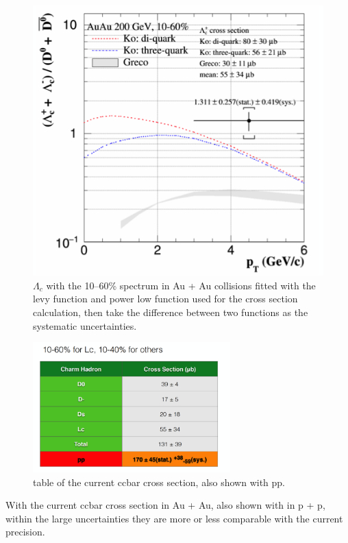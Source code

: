 \begin{figure}[htbp]
\begin{minipage}[htbp]{0.47\linewidth}
\includegraphics[width=1.0\textwidth,angle=0]{figure/Run14_D0HFT/ccx_4.png}
\caption{$\Lambda_{c}$ with the 10--60\% spectrum in Au + Au collisions fitted with the levy function and power low function used for the cross section calculation, then take the difference between two functions as the systematic uncertainties. \label{ccx_4}}
\end{minipage}
\end{figure}

\begin{figure}
\centering
\includegraphics[width=0.68\textwidth]{figure/Run14_D0HFT/ccx_5.png}
\caption{table of the current ccbar cross section, also shown with pp.}
\label{ccx_5} 
\end{figure}

With the current ccbar cross section in Au + Au, also shown with in p + p, within the large uncertainties they are more or less comparable with the current precision.

